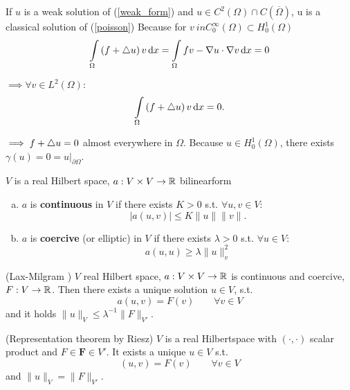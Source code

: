 If $u$ is a weak solution of (\ref{weak_form}) and $u \in C^2(\Omega)\cap C(\overline{\Omega})$, u is a classical solution of (\ref{poisson}) Because for $v \ in C^\infty_0(\Omega) \subset H^1_0(\Omega)$
\begin{equation*}
	\int \limits_\Omega \left( f + \mathop{}\!\mathbin\bigtriangleup u \right) v \mathop{}\!\mathrm{d} x = \int \limits_\Omega  fv - \nabla u \cdot \nabla v \mathop{}\!\mathrm{d} x = 0
\end{equation*}

$\implies \forall v\in L^2(\Omega):$ 
\begin{equation*}
	\int \limits_\Omega \left( f + \mathop{}\!\mathbin\bigtriangleup u \right) v \mathop{}\!\mathrm{d} x = 0.
\end{equation*}

$\implies f + \mathop{}\!\mathbin\bigtriangleup u = 0$ almost everywhere in $\Omega$.\enter
Because $u \in H^1_0(\Omega)$, there exists $\gamma(u) = 0 = u|_{\partial \Omega}$.

\begin{definition_}
	$V$ is a real Hilbert space, $a: V \times V \to \mathbb{R}$ bilinearform
	\begin{enumerate}[(a)]
		\item $a$ is \textbf{continuous} in $V$ if there exists $K > 0$ s.t. $\forall u,v \in V:$ 
		\begin{equation*}
			|a(u,v)| \leq K \|u\| \|v\|.
		\end{equation*} 
		\item $a$ is \textbf{coercive} (or elliptic) in $V$ if there exists $\lambda > 0$ s.t. $\forall u \in V:$
		\begin{equation*}
			a(u,u)  \geq \lambda \|u\|^2_v
		\end{equation*}
	\end{enumerate}
\end{definition_}

\begin{thrm}
	(Lax-Milgram )\enter
	$V$ real Hilbert space, $a: V \times V \to \mathbb{R}$ is continuous and coercive, $F:V \to \mathbb{R}$. Then there exists a unique solution $u \in V$, s.t.
	\begin{equation*}
		a(u,v) = F(v) \qquad \forall v \in V
	\end{equation*}
	and it holds $\|u\|_V \leq \lambda^{-1}\|F\|_{V'}$.
\end{thrm}

\begin{reminder}
	(Representation theorem by Riesz)\enter
	$V$ is a real Hilbertspace with $(\cdot,\cdot)$ scalar product and $F \in \textbf{F} \in V'$. It exists a unique $u \in V$ s.t.
	\begin{equation*}
		(u,v) = F(v) \qquad \forall v\in V
	\end{equation*} 
	and $\|u\|_V = \|F\|_{V'}$.
\end{reminder}

